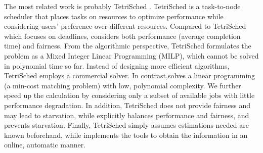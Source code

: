The most related work is probably TetriSched \cite{tetrisched}. 
TetriSched is a task-to-node scheduler that places tasks on resources to optimize performance while considering users'  preference over different resources. %
Compared to TetriSched which focuses on deadlines, \name considers both performance (average completion time) and fairness. From the algorithmic perspective, TetriSched formulates the problem as a Mixed Integer Linear Programming (MILP), which cannot be solved in polynomial time so far. Instead of designing more efficient algorithms, TetriSched employs a commercial solver. In contrast,\name solves a linear programming (a min-cost matching problem) with low, polynomial complexity. We further speed up the calculation by considering only a subset of available jobs with little performance degradation. 
In addition, TetriSched does not provide fairness and may lead to starvation, while \name explicitly balances performance and fairness, and prevents starvation. 
Finally, TetriSched simply assumes estimations needed are known beforehand, while \name implements the tools to obtain the information in an online, automatic manner. 
